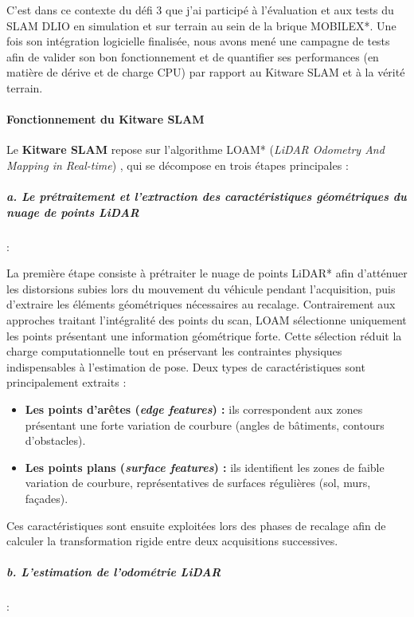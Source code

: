 \indent C'est dans ce contexte du défi 3 que j'ai participé à l'évaluation et aux tests du SLAM DLIO en simulation et sur terrain au sein de la brique MOBILEX*. Une fois son intégration logicielle finalisée, nous avons mené une campagne de tests afin de valider son bon fonctionnement et de quantifier ses performances (en matière de dérive et de charge CPU) par rapport au Kitware SLAM et à la vérité terrain.


\paragraph{Fonctionnement du Kitware SLAM}

Le \textbf{Kitware SLAM} repose sur l'algorithme LOAM* (\textit{LiDAR Odometry And Mapping in Real-time}) \cite{LOAM}, qui se décompose en trois étapes principales :

\subparagraph{a. Le prétraitement et l'extraction des caractéristiques géométriques du nuage de points LiDAR}:

La première étape consiste à prétraiter le nuage de points LiDAR* afin d'atténuer les distorsions subies lors du mouvement du véhicule pendant l'acquisition, puis d'extraire les éléments géométriques nécessaires au recalage. Contrairement aux approches traitant l'intégralité des points du scan, LOAM sélectionne uniquement les points présentant une information géométrique forte. Cette sélection réduit la charge computationnelle tout en préservant les contraintes physiques indispensables à l'estimation de pose. Deux types de caractéristiques sont principalement extraits :\\

\begin{itemize}
    \item \textbf{Les points d'arêtes (\textit{edge features}) :} ils correspondent aux zones présentant une forte variation de courbure (angles de bâtiments, contours d'obstacles).
    \item \textbf{Les points plans (\textit{surface features}) :} ils identifient les zones de faible variation de courbure, représentatives de surfaces régulières (sol, murs, façades).\\
\end{itemize}

Ces caractéristiques sont ensuite exploitées lors des phases de recalage afin de calculer la transformation rigide entre deux acquisitions successives.

\subparagraph{b. L'estimation de l'odométrie LiDAR}:

